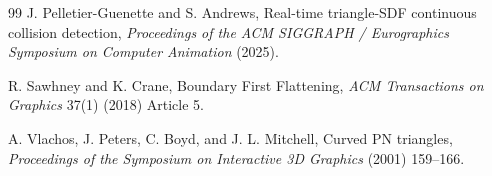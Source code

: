 \documentclass[preprint,12pt]{elsarticle}
\begin{document}
\begin{thebibliography}{99}
J. Pelletier-Guenette and S. Andrews, Real-time triangle-SDF continuous collision detection, \emph{Proceedings of the ACM SIGGRAPH / Eurographics Symposium on Computer Animation} (2025).

R. Sawhney and K. Crane, Boundary First Flattening, \emph{ACM Transactions on Graphics} 37(1) (2018) Article 5.

A. Vlachos, J. Peters, C. Boyd, and J. L. Mitchell, Curved PN triangles, \emph{Proceedings of the Symposium on Interactive 3D Graphics} (2001) 159--166.

\end{thebibliography}
\end{document}
